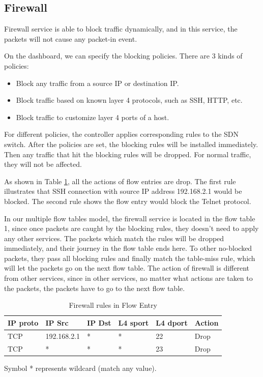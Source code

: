 \documentclass[journal]{IEEEtran}
\begin{document}
\subsection{Firewall}
Firewall service is able to block traffic dynamically, and in this service, the packets will not cause any packet-in event.

On the dashboard, we can specify the blocking policies. There are 3 kinds of policies:
\begin{itemize}[]
\item Block any traffic from a source IP or destination IP.
\item Block traffic based on known layer 4 protocols, such as SSH, HTTP, etc.
\item Block traffic to customize layer 4 ports of a host.
\end{itemize}

For different policies, the controller applies corresponding rules to the SDN switch. After the policies are set, the blocking rules will be installed immediately. Then any traffic that hit the blocking rules will be dropped. For normal traffic, they will not be affected.

As shown in Table \ref{table:fw}, all the actions of flow entries are drop. The first rule illustrates that SSH connection with source IP address 192.168.2.1 would be blocked. The second rule shows the flow entry would block the Telnet protocol.

In our multiple flow tables model, the firewall service is located in the flow table 1, since once packets are caught by the blocking rules, they doesn't need to apply any other services. The packets which match the rules will be dropped immediately, and their journey in the flow table ends here. To other no-blocked packets, they pass all blocking rules and finally match the table-miss rule, which will let the packets go on the next flow table. The action of firewall is different from other services, since in other services, no matter what actions are taken to the packets, the packets have to go to the next flow table.

\begin{table}[!t]
\caption{Firewall rules in Flow Entry}
\label{table:fw}
\centering
\begin{threeparttable}
\begin{tabular}{|l|l|l|l|l|l|}
\hline
IP proto & IP Src      & IP Dst       & L4 sport & L4 dport & Action \\ \hline
TCP      & 192.168.2.1 & *            & *        & 22       & Drop   \\ \hline
TCP      & *           & *            & *        & 23       & Drop   \\ \hline
\end{tabular}
  \begin{tablenotes}
    \item[] Symbol * represents wildcard (match any value).
  \end{tablenotes}
\end{threeparttable}
\end{table}
\end{document}
